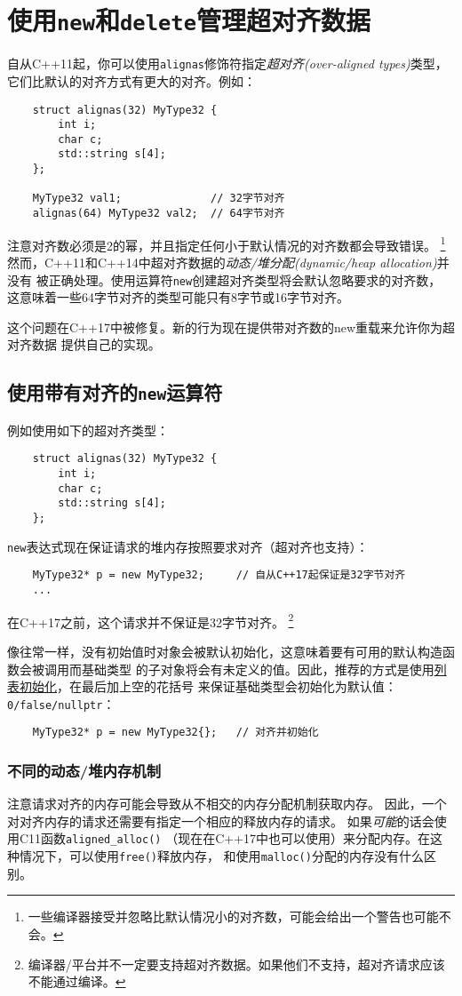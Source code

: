 \chapter{使用\texttt{new}和\texttt{delete}管理超对齐数据}\label{ch30}
自从C++11起，你可以使用\texttt{alignas}修饰符指定\emph{超对齐(over-aligned types)}类型，
它们比默认的对齐方式有更大的对齐。例如：
\begin{lstlisting}
    struct alignas(32) MyType32 {
        int i;
        char c;
        std::string s[4];
    };

    MyType32 val1;              // 32字节对齐
    alignas(64) MyType32 val2;  // 64字节对齐
\end{lstlisting}
注意对齐数必须是2的幂，并且指定任何小于默认情况的对齐数都会导致错误。
\footnote{一些编译器接受并忽略比默认情况小的对齐数，可能会给出一个警告也可能不会。}
然而，C++11和C++14中超对齐数据的\emph{动态/堆分配(dynamic/heap allocation)}并没有
被正确处理。使用运算符\texttt{new}创建超对齐类型将会默认忽略要求的对齐数，
这意味着一些64字节对齐的类型可能只有8字节或16字节对齐。

这个问题在C++17中被修复。新的行为现在提供带对齐数的new重载来允许你为超对齐数据
提供自己的实现。


\section{使用带有对齐的\texttt{new}运算符}
例如使用如下的超对齐类型：
\begin{lstlisting}
    struct alignas(32) MyType32 {
        int i;
        char c;
        std::string s[4];
    };
\end{lstlisting}
\texttt{new}表达式现在保证请求的堆内存按照要求对齐（超对齐也支持）：
\begin{lstlisting}
    MyType32* p = new MyType32;     // 自从C++17起保证是32字节对齐
    ...
\end{lstlisting}
在C++17之前，这个请求并不保证是32字节对齐。
\footnote{编译器/平台并不一定要支持超对齐数据。如果他们不支持，超对齐请求应该不能通过编译。}

像往常一样，没有初始值时对象会被默认初始化，这意味着要有可用的默认构造函数会被调用而基础类型
的子对象将会有未定义的值。因此，推荐的方式是使用\hyperref[]{列表初始化}，在最后加上空的花括号
来保证基础类型会初始化为默认值：\texttt{0/false/nullptr}：
\begin{lstlisting}
    MyType32* p = new MyType32{};   // 对齐并初始化
\end{lstlisting}

\subsection{不同的动态/堆内存机制}\label{ch30.1.1}
注意请求对齐的内存可能会导致从不相交的内存分配机制获取内存。
因此，一个对对齐内存的请求还需要有指定一个相应的释放内存的请求。
如果\emph{可能}的话会使用C11函数\texttt{aligned\_alloc()}
（现在在C++17中也可以使用）来分配内存。在这种情况下，可以使用\texttt{free()}释放内存，
和使用\texttt{malloc()}分配的内存没有什么区别。

